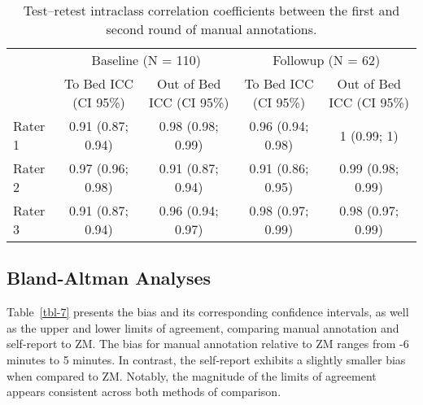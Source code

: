 \documentclass[
  10pt,
]{scrbook}
\begin{document}
\begingroup

\footnotesize

\hypertarget{tbl-man_icc_test_retest}{}
\begin{longtable}{lcccc}
\caption{\label{tbl-man_icc_test_retest}Test--retest intraclass correlation coefficients between the first and
second round of manual annotations. }\tabularnewline

\toprule
 & \multicolumn{2}{c}{Baseline (N = 110)} & \multicolumn{2}{c}{Followup (N = 62)} \\ 
\cmidrule(lr){2-3} \cmidrule(lr){4-5}
 & To Bed
ICC (CI 95\%) & Out of Bed
ICC (CI 95\%) & To Bed
ICC (CI 95\%) & Out of Bed
ICC (CI 95\%) \\ 
\midrule
Rater 1 & 0.91 (0.87; 0.94) & 0.98 (0.98; 0.99) & 0.96 (0.94; 0.98) & 1 (0.99; 1) \\ 
Rater 2 & 0.97 (0.96; 0.98) & 0.91 (0.87; 0.94) & 0.91 (0.86; 0.95) & 0.99 (0.98; 0.99) \\ 
Rater 3 & 0.91 (0.87; 0.94) & 0.96 (0.94; 0.97) & 0.98 (0.97; 0.99) & 0.98 (0.97; 0.99) \\ 
\bottomrule
\end{longtable}

\endgroup

\hypertarget{bland-altman-analyses}{%
\subsection{Bland-Altman Analyses}\label{bland-altman-analyses}}

Table~\ref{tbl-7} presents the bias and its corresponding confidence
intervals, as well as the upper and lower limits of agreement, comparing
manual annotation and self-report to ZM. The bias for manual annotation
relative to ZM ranges from -6 minutes to 5 minutes. In contrast, the
self-report exhibits a slightly smaller bias when compared to ZM.
Notably, the magnitude of the limits of agreement appears consistent
across both methods of comparison.

\begingroup

\footnotesize
\end{document}
